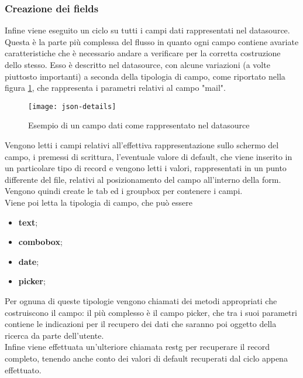 \subsubsection{Creazione dei fields}
Infine viene eseguito un ciclo su tutti i campi dati rappresentati nel datasource. Questa è la parte più complessa del flusso in quanto ogni campo contiene avariate caratteristiche che è necessario andare a verificare per la corretta costruzione dello stesso. Esso è descritto nel datasource, con alcune variazioni (a volte piuttosto importanti) a seconda della tipologia di campo, come riportato nella figura \ref{fig:json-details}, che rappresenta i parametri relativi al campo "mail".\\  
	\begin{figure}[h]
		\centering
		\texttt{[image: json-details]}
		\caption{Esempio di un campo dati come rappresentato nel datasource}
		\label{fig:json-details}
	\end{figure}
Vengono letti i campi relativi all'effettiva rappresentazione sullo schermo del campo, i premessi di scrittura, l'eventuale valore di default, che viene inserito in un particolare tipo di \gls{record} e vengono letti i valori, rappresentati in un punto differente del file, relativi al posizionamento del campo all'interno della form.\\
Vengono quindi create le tab ed i groupbox per contenere i campi.\\
Viene poi letta la tipologia di campo, che può essere
\begin{itemize}
	\item \textbf{text};
	\item \textbf{combobox};
	\item \textbf{date};
	\item \textbf{picker};
\end{itemize}
Per ognuna di queste tipologie vengono chiamati dei metodi appropriati che costruiscono il campo: il più complesso è il campo picker, che tra i suoi parametri contiene le indicazioni per il recupero dei dati che saranno poi oggetto della ricerca da parte dell'utente.\\
Infine viene effettuata un'ulteriore chiamata \gls{restg} per recuperare il record completo, tenendo anche conto dei valori di default recuperati dal ciclo appena effettuato.

\newpage